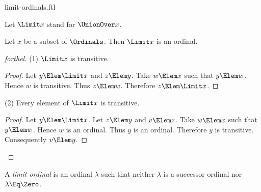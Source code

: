 \documentclass{stex}
\begin{document}
\begin{smodule}{limit-ordinals.ftl}




\begin{convention*}[forthel,for=Limit]
  Let $\Limit x$ stand for $\UnionOver x$.
\end{convention*}

\begin{proposition*}[forthel]
  Let $x$ be a subset of $\Ordinals$.
  Then $\Limit x$ is an ordinal.
\end{proposition*}
\begin{proof}[forthel]
  (1) $\Limit x$ is transitive.
  \begin{proof}
    Let $y \Elem \Limit x$ and $z \Elem y$.
    Take $w \Elem x$ such that $y \Elem w$.
    Hence $w$ is transitive.
    Thus $z \Elem w$.
    Therefore $z \Elem \Limit x$.
  \end{proof}

  (2) Every element of $\Limit x$ is transitive.
  \begin{proof}
    Let $y \Elem \Limit x$.
    Let $z \Elem y$ and $v \Elem z$.
    Take $w \Elem x$ such that $y \Elem w$.
    Hence $w$ is an ordinal.
    Thus $y$ is an ordinal.
    Therefore $y$ is transitive.
    Consequently $v \Elem y$.
  \end{proof}
\end{proof}

\begin{definition*}[forthel,for=limit ordinal]
  A \emph{limit ordinal} is an ordinal $\lambda$ such that neither $\lambda$ is a successor ordinal nor $\lambda \Eq \Zero$.
\end{definition*}

\end{smodule}
\end{document}
